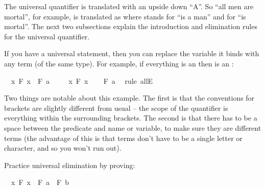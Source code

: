 \begin{isabellebody}
\begin{isamarkuptext}
The universal quantifier is translated with an upside down ``A''. So ``all men are mortal'',
for example, is translated as  where  stands for ``is a man''
and  for ``is mortal''. The next two subsections explain the introduction and elimination
rules for the universal quantifier.%
\end{isamarkuptext}\isamarkuptrue%
%
\isamarkuptrue%
%
\begin{isamarkuptext}%
If you have a universal statement, then you can replace the variable it binds with any term 
(of the same type). For example, if everything is an  then  is an :%
\end{isamarkuptext}\isamarkuptrue%
\isamarkupfalse%
\ {\isachardoublequoteopen}{\isacharparenleft}{\isasymforall}\ x{\isachardot}\ F\ x{\isacharparenright}\ {\isasymlongrightarrow}\ F\ a{\isachardoublequoteclose}\isanewline
%
\isadelimproof
%
\endisadelimproof
%
\isatagproof
{}\isamarkupfalse%
\isanewline
\ \ \isamarkupfalse%
\ {\isachardoublequoteopen}{\isasymforall}\ x{\isachardot}\ F\ x{\isachardoublequoteclose}\isanewline
\ \ \isamarkupfalse%
\ {\isachardoublequoteopen}F\ a{\isachardoublequoteclose}\ \isamarkupfalse%
\ {\isacharparenleft}rule\ allE{\isacharparenright}\isanewline
{}\isamarkupfalse%
%
\endisatagproof
{\isafoldproof}%
%
\isadelimproof
%
\endisadelimproof
%
\begin{isamarkuptext}%
Two things are notable about this example. The first is that the conventions for brackets are 
slightly different from usual -- the scope of the quantifier is everything within the surrounding 
brackets. The second is that there has to be a space between the predicate and name or variable,
to make sure they are different terms (the advantage of this is that terms don't have to be a single
letter or character, and so you won't run out).%
\end{isamarkuptext}\isamarkuptrue%
%
\begin{isamarkuptext}%
\begin{Exercise} Practice universal elimination by proving: \end{Exercise}%
\end{isamarkuptext}\isamarkuptrue%
\isamarkupfalse%
\ {\isachardoublequoteopen}{\isacharparenleft}{\isasymforall}\ x{\isachardot}\ F\ x{\isacharparenright}\ {\isasymlongrightarrow}\ F\ a\ {\isasymand}\ F\ b{\isachardoublequoteclose}%

\end{isabellebody}
